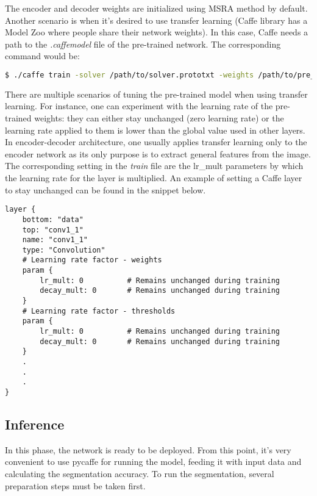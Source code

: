 The encoder and decoder weights are initialized using MSRA method by default. Another scenario is when it's desired to use transfer learning (Caffe library has a Model Zoo where people share their network weights). In this case, Caffe needs a path to the \textit{.caffemodel} file of the pre-trained network. The corresponding command would be:

\begin{lstlisting}[language=bash]
$ ./caffe train -solver /path/to/solver.prototxt -weights /path/to/pre_trained_weights.caffemodel
\end{lstlisting}

There are multiple scenarios of tuning the pre-trained model when using transfer learning. For instance, one can experiment with the learning rate of the pre-trained weights: they can either stay unchanged (zero learning rate) or the learning rate applied to them is lower than the global value used in other layers. In encoder-decoder architecture, one usually applies transfer learning only to the encoder network as its only purpose is to extract general features from the image. The corresponding setting in the \textit{train} file are the lr\_mult parameters by which the learning rate for the layer is multiplied. An example of setting a Caffe layer to stay unchanged can be found in the snippet below.

\begin{lstlisting}[caption={Setting up \textit{train.prototxt} for transfer learning},captionpos=b]
layer {
	bottom: "data"
	top: "conv1_1"
	name: "conv1_1"
	type: "Convolution"
	# Learning rate factor - weights
	param {
		lr_mult: 0			# Remains unchanged during training
		decay_mult: 0		# Remains unchanged during training
	}
	# Learning rate factor - thresholds
	param {
		lr_mult: 0			# Remains unchanged during training
		decay_mult: 0		# Remains unchanged during training
	}
	.
	.
	.
}
\end{lstlisting}


\newpage
\subsection{Inference}

In this phase, the network is ready to be deployed. From this point, it's very convenient to use pycaffe for running the model, feeding it with input data and calculating the segmentation accuracy. To run the segmentation, several preparation steps must be taken first.

